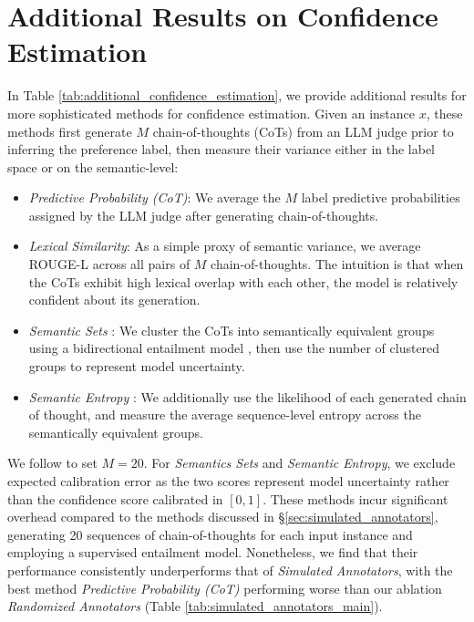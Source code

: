 
\newpage
\section{Additional Results on Confidence Estimation}\label{app:additional_results_on_confidence_estimation}


In Table \ref{tab:additional_confidence_estimation}, we provide additional results for more sophisticated methods for confidence estimation. Given an instance $x$, these methods first generate $M$ chain-of-thoughts (CoTs) from an LLM judge prior to inferring the preference label, then measure their variance either in the label space or on the semantic-level:
\begin{itemize}
    \item \textit{Predictive Probability (CoT)}: We average the $M$ label predictive probabilities assigned by the LLM judge after generating chain-of-thoughts.
    \item \textit{Lexical Similarity}: As a simple proxy of semantic variance, we average ROUGE-L across all pairs of $M$ chain-of-thoughts. The intuition is that when the CoTs exhibit high lexical overlap with each other, the model is relatively confident about its generation.
    \item \textit{Semantic Sets} \citep{semantic-eigenvalue}: We cluster the CoTs into semantically equivalent groups using a bidirectional entailment model \citep{alignscore}, then use the number of clustered groups to represent model uncertainty.
    \item \textit{Semantic Entropy} \citep{semantic-entropy}: We additionally use the likelihood of each generated chain of thought, and measure the average sequence-level entropy across the semantically equivalent groups.
\end{itemize}
We follow \cite{semantic-eigenvalue} to set $M = 20$. For \textit{Semantics Sets} and \textit{Semantic Entropy}, we exclude expected calibration error as the two scores represent model uncertainty rather than the confidence score calibrated in $[0, 1]$. These methods incur significant overhead compared to the methods discussed in \S \ref{sec:simulated_annotators}, generating 20 sequences of chain-of-thoughts for each input instance and employing a supervised entailment model. Nonetheless, we find that their performance consistently underperforms that of \textit{Simulated Annotators}, with the best method \textit{Predictive Probability (CoT)} performing worse than our ablation \textit{Randomized Annotators} (Table \ref{tab:simulated_annotators_main}).

